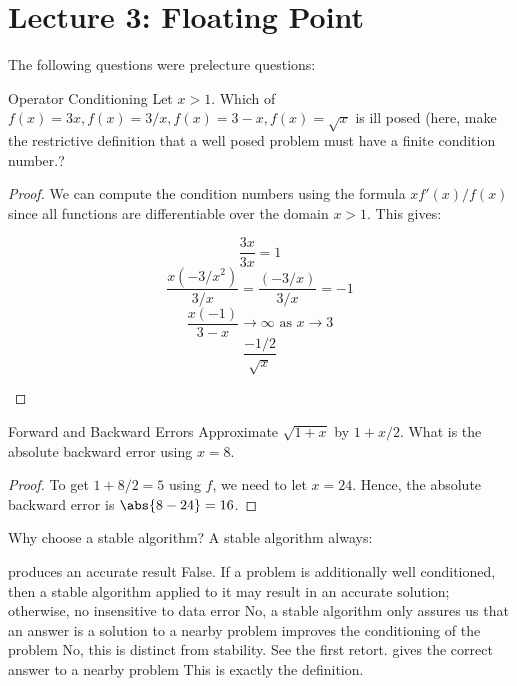 \documentclass[../main.tex]{subfiles}
\begin{document}
\section{Lecture 3: Floating Point}

The following questions were prelecture questions:

\begin{problem}{Operator Conditioning}
    Let $x > 1$. Which of $f(x) = 3x, f(x) = 3/x, f(x) = 3-x, f(x) = \sqrt{x}$ is ill posed (here, make the restrictive definition that a well posed problem must have a finite condition number.? 
\end{problem}
\begin{proof}
   We can compute the condition numbers using the formula $xf'(x)/f(x)$ since all functions are differentiable over the domain $x > 1$. This gives:

   \begin{outline}
       \1 \[
           \frac{3x}{3x} = 1
       \]
       \1 
       \[
           \frac{x (-3/x^2)}{3/x} = \frac{(-3/x)}{3/x} = -1
       \]
       \1 \[
           \frac{x (-1)}{3 - x} \to \infty \text{ as } x \to 3
       \]
       \1
       \[
           \frac{-1/2}{\sqrt{x}}
       \]
   \end{outline}
\end{proof}

\begin{problem}{Forward and Backward Errors}
    Approximate $\sqrt{1 + x}$ by $1 + x/2$. What is the absolute
    backward error using $x = 8$.
\end{problem}

\begin{proof}
    To get $1 + 8/2 = 5$ using $f$, we need to let $x = 24$. Hence,
    the absolute backward error is $\abs{8 - 24} = 16$.
\end{proof}

\begin{problem}{Why choose a stable algorithm?}
    A stable algorithm always:
    \begin{outline}
        \1 produces an accurate result
        \2 False. If a problem is additionally well conditioned, then
        a stable algorithm applied to it may result in an accurate solution; otherwise, no
        \1 insensitive to data error
        \2 No, a stable algorithm only assures us that an answer is a solution to a nearby problem
        \1 improves the conditioning of the problem
        \2 No, this is distinct from stability. See the first retort.
        \1 gives the correct answer to a nearby problem
        \2 This is exactly the definition.
    \end{outline}
\end{problem}
\end{document}
